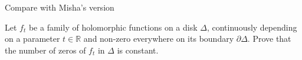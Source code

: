 Compare with Misha's version

\begin{theorem}
\label{theorem-Rouche-theorem-Mishas-version}
Let $f_t$ be a family of holomorphic functions on a disk  $\Delta$, continuously
depending on a parameter $t\in \mathbb{R}$ and non-zero everywhere on its
boundary $\partial\Delta$. Prove that the number of zeros of $f_t$ in $\Delta$
is constant.
\end{theorem}







